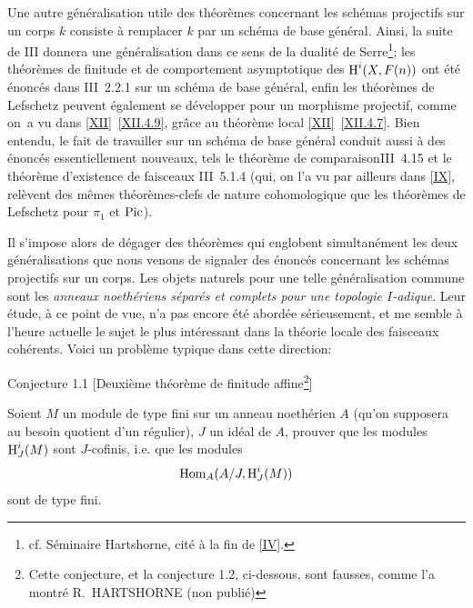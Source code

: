 Une autre g\'en\'eralisation utile des th\'eor\`emes concernant les sch\'emas projectifs sur un corps $k$ consiste \`a remplacer $k$ par un sch\'ema de base g\'en\'eral. Ainsi, la suite de {\EGA III} donnera une g\'en\'eralisation dans ce sens de la dualit\'e de Serre\footnote{cf. S\'eminaire Hartshorne, cit\'e \`a la fin de {\Exp \ref{IV}}.}; les th\'eor\`emes de finitude et de comportement asymptotique des $\operatorname{H}^i(X, F(n))$ ont \'et\'e \'enonc\'es dans \EGA III~2.2.1 sur un sch\'ema de base g\'en\'eral, enfin les th\'eor\`emes de Lefschetz peuvent \'egalement se d\'evelopper pour un morphisme projectif, comme on~a vu dans \ref{XII}~\ref{XII.4.9}, gr\^ace au th\'eor\`eme local \ref{XII}~\ref{XII.4.7}. Bien entendu, le fait de travailler sur un sch\'ema de base g\'en\'eral conduit aussi \`a des \'enonc\'es essentiellement nouveaux, tels le \og th\'eor\`eme de comparaison\fg \EGA III~4.15 et le th\'eor\`eme d'existence de faisceaux \EGA III~5.1.4 (qui, on l'a vu par ailleurs dans \ref{IX}, rel\`event des m\^emes th\'eor\`emes-clefs de nature cohomologique que les th\'eor\`emes de Lefschetz pour $\pi_1$ et $\operatorname{Pic}$).

Il s'impose alors de d\'egager des th\'eor\`emes qui englobent simultan\'ement les deux g\'en\'eralisations que nous venons de signaler des \'enonc\'es concernant les sch\'emas projectifs sur un corps. Les objets naturels pour une telle g\'en\'eralisation commune sont les \emph{anneaux noethériens séparés et complets pour une topologie $I$-adique}. Leur \'etude, \`a ce point de vue, n'a pas encore \'et\'e abord\'ee s\'erieusement, et me semble \`a l'heure actuelle le sujet le plus int\'eressant dans la th\'eorie locale des faisceaux coh\'erents. Voici un probl\`eme typique dans cette direction:

\label{XIII.1.1}

\begin{enonce*}{Conjecture 1.1}
[\og Deuxi\`eme th\'eor\`eme de finitude affine\fg\footnote{Cette conjecture, et la conjecture 1.2, ci-dessous, sont fausses, comme l'a montr\'e R.~HARTSHORNE (non publi\'e)}\ndemark]

Soient $M$ un module de type fini sur un anneau noeth\'erien $A$ (qu'on supposera au besoin quotient d'un r\'egulier), $J$ un id\'eal de $A$, prouver que les modules $\operatorname{H}^i_J(M)$ sont \og $J$-cofinis\fg, i.e. que les modules
$$
\operatorname{Hom}_A(A/J, \operatorname{H}^i_J(M))$$
sont de type fini.
\end{enonce*}

